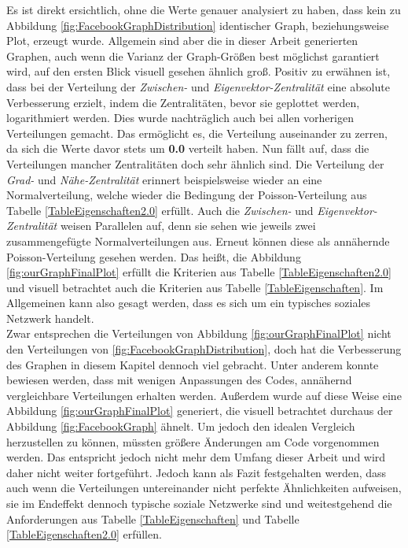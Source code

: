 Es ist direkt ersichtlich, ohne die Werte genauer analysiert zu haben, dass kein zu Abbildung \ref{fig:FacebookGraphDistribution} identischer Graph, beziehungsweise Plot, erzeugt wurde. Allgemein sind aber die in dieser Arbeit generierten Graphen, auch wenn die Varianz der Graph-Größen best möglichst garantiert wird, auf den ersten Blick visuell gesehen ähnlich groß. Positiv zu erwähnen ist, dass bei der Verteilung der \textit{Zwischen-} und \textit{Eigenvektor-Zentralität} eine absolute Verbesserung erzielt, indem die Zentralitäten, bevor sie geplottet werden, logarithmiert werden. Dies wurde nachträglich auch bei allen vorherigen Verteilungen gemacht. Das ermöglicht es, die Verteilung auseinander zu zerren, da sich die Werte davor stets um \textbf{0.0} verteilt haben. Nun fällt auf, dass die Verteilungen mancher Zentralitäten doch sehr ähnlich sind. Die Verteilung der \textit{Grad-} und \textit{Nähe-Zentralität} erinnert beispielsweise wieder an eine Normalverteilung, welche wieder die Bedingung der Poisson-Verteilung aus Tabelle \ref{TableEigenschaften2.0} erfüllt. Auch die \textit{Zwischen-} und \textit{Eigenvektor-Zentralität} weisen Parallelen auf, denn sie sehen wie jeweils zwei zusammengefügte Normalverteilungen aus. Erneut können diese als annähernde Poisson-Verteilung gesehen werden. Das heißt, die Abbildung \ref{fig:ourGraphFinalPlot} erfüllt die Kriterien aus Tabelle \ref{TableEigenschaften2.0} und visuell betrachtet auch die Kriterien aus Tabelle \ref{TableEigenschaften}. Im Allgemeinen kann also gesagt werden, dass es sich um ein typisches soziales Netzwerk handelt. \\

Zwar entsprechen die Verteilungen von Abbildung \ref{fig:ourGraphFinalPlot} nicht den Verteilungen von \ref{fig:FacebookGraphDistribution}, doch hat die Verbesserung des Graphen in diesem Kapitel dennoch viel gebracht. Unter anderem konnte bewiesen werden, dass mit wenigen Anpassungen des Codes, annähernd vergleichbare Verteilungen erhalten werden. Außerdem wurde auf diese Weise eine Abbildung \ref{fig:ourGraphFinalPlot} generiert, die visuell betrachtet durchaus der Abbildung \ref{fig:FacebookGraph} ähnelt. Um jedoch den idealen Vergleich herzustellen zu können, müssten größere Änderungen am Code vorgenommen werden. Das entspricht jedoch nicht mehr dem Umfang dieser Arbeit und wird daher nicht weiter fortgeführt. Jedoch kann als Fazit festgehalten werden, dass auch wenn die Verteilungen untereinander nicht perfekte Ähnlichkeiten aufweisen, sie im Endeffekt dennoch typische soziale Netzwerke sind und weitestgehend die Anforderungen aus Tabelle \ref{TableEigenschaften} und Tabelle \ref{TableEigenschaften2.0} erfüllen. 



